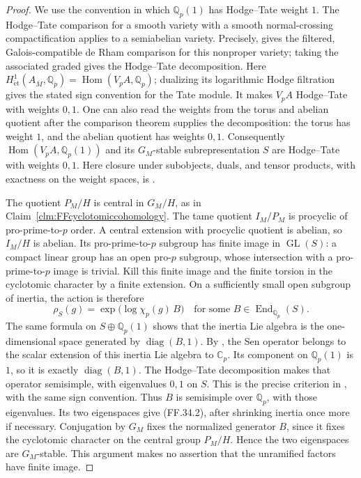 \begin{proof}
We use the convention in which \(\mathbb Q_p(1)\)
has Hodge--Tate weight \(1\). The Hodge--Tate comparison
for a smooth variety with a smooth normal-crossing
compactification applies to a semiabelian variety.
Precisely, \citet[Proposition in Section~3.4 and
Theorem~3.6, especially proof~(d)]{FF_Beilinson2012}
gives the filtered, Galois-compatible de Rham
comparison for this nonproper variety; taking
the associated graded gives the Hodge--Tate
decomposition.
Here \(H^1_{\mathrm{\acute et}}(A_{\overline M},\mathbb Q_p)
=\operatorname{Hom}(V_pA,\mathbb Q_p)\); dualizing
its logarithmic Hodge filtration gives the stated
sign convention for the Tate module.
It makes \(V_pA\) Hodge--Tate with weights \(0,1\).
One can also read the weights from the torus and abelian
quotient after the comparison theorem supplies the
decomposition: the torus has weight \(1\), and the
abelian quotient has weights \(0,1\).
Consequently \(\operatorname{Hom}(V_pA,\mathbb Q_p(1))\)
and its \(G_M\)-stable subrepresentation \(S\) are
Hodge--Tate with weights \(0,1\).
Here closure under subobjects, duals, and tensor
products, with exactness on the weight spaces, is
\citet[Theorem~4.2]{FF_Fontaine2004}.

The quotient \(P_M/H\) is central in \(G_M/H\), as in
Claim~\ref{clm:FFcyclotomiccohomology}. The tame quotient
\(I_M/P_M\) is procyclic of pro-prime-to-\(p\) order.
A central extension with procyclic quotient is abelian,
so \(I_M/H\) is abelian. Its pro-prime-to-\(p\)
subgroup has finite image in \(\operatorname{GL}(S)\):
a compact linear group has an open pro-\(p\) subgroup,
whose intersection with a pro-prime-to-\(p\) image is
trivial. Kill this finite image and the finite torsion
in the cyclotomic character by a finite extension.
On a sufficiently small open subgroup of inertia,
the action is therefore
\[
           \rho_S(g)=\exp\bigl(\log\chi_p(g)\,B\bigr)
              \quad\text{for some }B\in\operatorname{End}_{\mathbb Q_p}(S).
                                                        \tag{FF.34.3}
\]
The same formula on \(S\oplus\mathbb Q_p(1)\)
shows that the inertia Lie algebra is the
one-dimensional space generated by \(\operatorname{diag}(B,1)\).
By \citet[Theorem~3.1, with \(d=0\)]{FF_Ohkubo2014},
the Sen operator belongs to the scalar extension of
this inertia Lie algebra to \(\mathbb C_p\).
Its component on \(\mathbb Q_p(1)\) is \(1\), so
it is exactly \(\operatorname{diag}(B,1)\).
The Hodge--Tate decomposition makes that operator
semisimple, with eigenvalues \(0,1\) on \(S\).
This is the precise criterion in
\citet[Section~2.7, printed p.~45]{FF_Fontaine2004},
with the same sign convention.
Thus \(B\) is semisimple over \(\mathbb Q_p\),
with those eigenvalues. Its two eigenspaces give
(FF.34.2), after shrinking inertia once more if necessary.
Conjugation by \(G_M\) fixes the normalized generator
\(B\), since it fixes the cyclotomic character on
the central group \(P_M/H\). Hence the two eigenspaces
are \(G_M\)-stable. This argument makes no assertion
that the unramified factors have finite image.


\end{proof}

